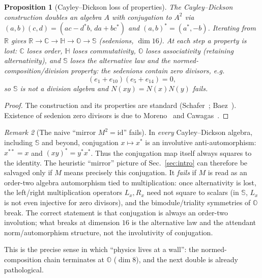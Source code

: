 \documentclass[aps,prresearch,onecolumn,amsmath,amssymb,nofootinbib]{revtex4-2}
\theoremstyle{plain}\newtheorem{theorem}{Theorem}[section]\newtheorem{proposition}[theorem]{Proposition}\newtheorem{lemma}[theorem]{Lemma}\newtheorem{corollary}[theorem]{Corollary}
\theoremstyle{definition}\newtheorem{definition}[theorem]{Definition}\newtheorem{conjecture}[theorem]{Conjecture}
\theoremstyle{remark}\newtheorem{remark}[theorem]{Remark}
\begin{document}
\begin{proposition}[Cayley--Dickson loss of properties]
\label{prop:CD}
The Cayley--Dickson construction doubles an algebra $A$ with conjugation to $A^2$ via $(a,b)(c,d)=(ac-d^{*}b,\,da+bc^{*})$ and $(a,b)^{*}=(a^{*},-b)$. Iterating from $\mathbb{R}$ gives $\mathbb{R}\to\mathbb{C}\to\mathbb{H}\to\mathbb{O}\to\mathbb{S}$ (sedenions, $\dim 16$). At each step a property is lost: $\mathbb{C}$ loses order, $\mathbb{H}$ loses commutativity, $\mathbb{O}$ loses associativity (retaining alternativity), and $\mathbb{S}$ loses the alternative law and the normed-composition/division property: the sedenions contain zero divisors, e.g.
\begin{equation}
(e_1+e_{10})(e_5+e_{14})=0,
\end{equation}
so $\mathbb{S}$ is not a division algebra and $N(xy)=N(x)N(y)$ fails.
\end{proposition}

\begin{proof}
The construction and its properties are standard (Schafer~\cite{Schafer1966}; Baez~\cite[Sec.~2.2]{Baez2002}). Existence of sedenion zero divisors is due to Moreno~\cite{Moreno1998} and Cawagas~\cite{Cawagas2004}.
\end{proof}

\begin{remark}[The naive ``mirror $M^2=\mathrm{id}$'' fails]
\label{rem:mirror}
In \emph{every} Cayley--Dickson algebra, including $\mathbb{S}$ and beyond, conjugation $x\mapsto x^{*}$ is an involutive anti-automorphism: $x^{**}=x$ and $(xy)^{*}=y^{*}x^{*}$. Thus the conjugation map itself always squares to the identity. The heuristic ``mirror'' picture of Sec.~\ref{sec:intro} can therefore be salvaged only if $M$ means precisely this conjugation. It \emph{fails} if $M$ is read as an order-two algebra automorphism tied to multiplication: once alternativity is lost, the left/right multiplication operators $L_x,R_x$ need not square to scalars (in $\mathbb{S}$, $L_x$ is not even injective for zero divisors), and the bimodule/triality symmetries of $\mathbb{O}$ break. The correct statement is that conjugation is always an order-two involution; what breaks at dimension $16$ is the alternative law and the attendant norm/automorphism structure, not the involutivity of conjugation.
\end{remark}

This is the precise sense in which ``physics lives at a wall'': the normed-composition chain terminates at $\mathbb{O}$ ($\dim 8$), and the next double is already pathological.
\end{document}
